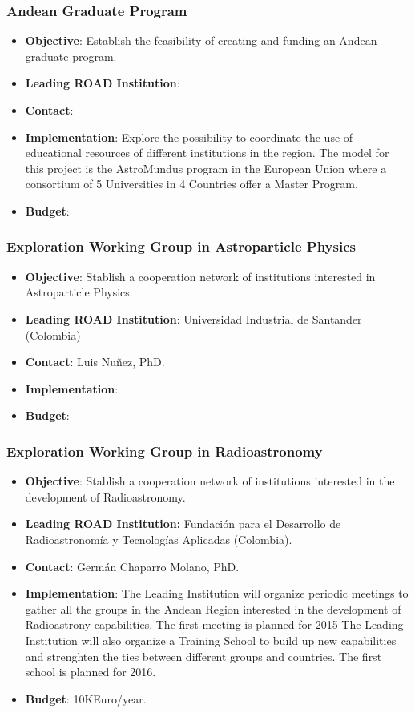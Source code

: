 \documentclass[12pt]{article}
\begin{document}
\subsubsection{Andean Graduate Program}
\begin{itemize}
\item{\bf Objective}: Establish the feasibility of creating and
  funding an Andean graduate program. 
  
\item{\bf Leading ROAD Institution}:
\item{\bf Contact}:
\item{\bf Implementation}:
  Explore the possibility to coordinate the use of
  educational resources of different institutions in the region. The
  model for this project is the AstroMundus program in the European
  Union where a consortium of 5 Universities in 4 Countries offer a
  Master Program.  
\item{\bf Budget}:
\end{itemize}

\subsubsection{Exploration Working Group in Astroparticle Physics}
\begin{itemize}
\item{\bf Objective}: Stablish a cooperation network of institutions
  interested in Astroparticle Physics.
\item{\bf Leading ROAD Institution}: Universidad
  Industrial de Santander (Colombia) 
\item{\bf Contact}: Luis Nu\~nez, PhD.
\item{\bf Implementation}:
\item{\bf Budget}:
\end{itemize}

\subsubsection{Exploration Working Group in Radioastronomy}
\begin{itemize}
\item{\bf Objective}: Stablish a cooperation network of institutions interested in the development of Radioastronomy.
\item{\bf Leading ROAD Institution:} Fundación para el Desarrollo de
  Radioastronomía y Tecnologías Aplicadas (Colombia).
\item{\bf Contact}: Germ\'an Chaparro Molano, PhD.
\item{\bf Implementation}: The Leading Institution will organize
  periodic meetings to gather all the groups in the Andean Region
  interested in the development of Radioastrony capabilities. The
  first meeting is planned for 2015 
The Leading Institution will also organize a Training School to build
up new capabilities and strenghten the ties between different groups
and countries. The first school is planned for 2016.
\item{\bf Budget}: 10KEuro/year.
\end{itemize}
\end{document}
